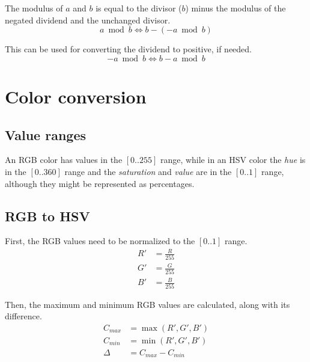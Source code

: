 \documentclass{article}
\begin{document}
\bigskip

The modulus of $a$ and $b$ is equal to the divisor ($b$) minus the modulus of
the negated dividend and the unchanged divisor.
\begin{equation*}
  a \bmod b \iff b - (-a \bmod b)
\end{equation*}

This can be used for converting the dividend to positive, if needed.
\begin{equation*}
  -a \bmod b \iff b - a \bmod b
\end{equation*}

\section{Color conversion}

\subsection{Value ranges}

An RGB color has values in the $[0..255]$ range, while in an HSV color the
\textit{hue} is in the $[0..360]$ range and the \textit{saturation} and
\textit{value} are in the $[0..1]$ range, although they might be represented as
percentages.

\subsection{RGB to HSV}

First, the RGB values need to be normalized to the $[0..1]$ range.
\begin{align*}
  R' &= \frac{R}{255} \\
  G' &= \frac{G}{255} \\
  B' &= \frac{B}{255}
\end{align*}

Then, the maximum and minimum RGB values are calculated, along with its
difference.
\begin{align*}
  C_{max} &= \max(R', G', B') \\
  C_{min} &= \min(R', G', B') \\
  \Delta  &= C_{max} - C_{min}
\end{align*}
\end{document}
